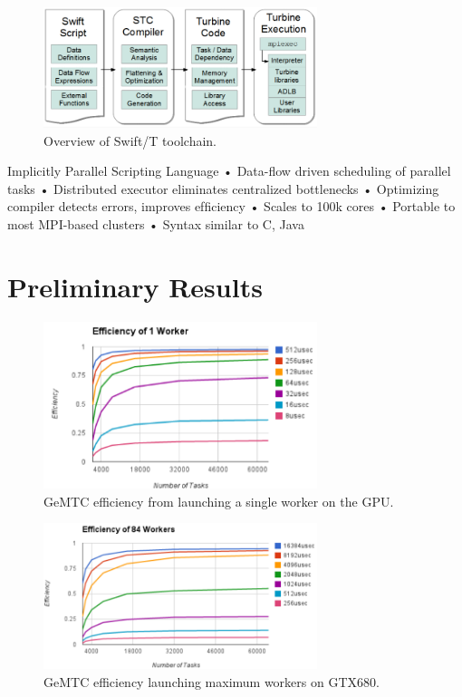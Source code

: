 \documentclass[conference]{IEEEtran}
\begin{document}
\begin{figure}[h]
\centering\includegraphics[width=8cm]{imgs/swiftt.png}
\caption{Overview of Swift/T toolchain.}
\label{fig:swiftt}
\end{figure}

Implicitly Parallel Scripting Language • Data-ﬂow driven scheduling of parallel tasks • Distributed executor eliminates centralized bottlenecks • Optimizing compiler detects errors, improves efﬁciency • Scales to 100k cores • Portable to most MPI-based clusters • Syntax similar to C, Java

\section{Preliminary Results}

\begin{figure}[h]
\centering\includegraphics[width=8cm]{imgs/1worker.png}
\caption{GeMTC efficiency from launching a single worker on the GPU.}
\label{fig:1worker}
\end{figure}

\begin{figure}[h]
\centering\includegraphics[width=8cm]{imgs/84workers.png}
\caption{GeMTC efficiency launching maximum workers on GTX680.}
\label{fig:84workers}
\end{figure}
\end{document}

